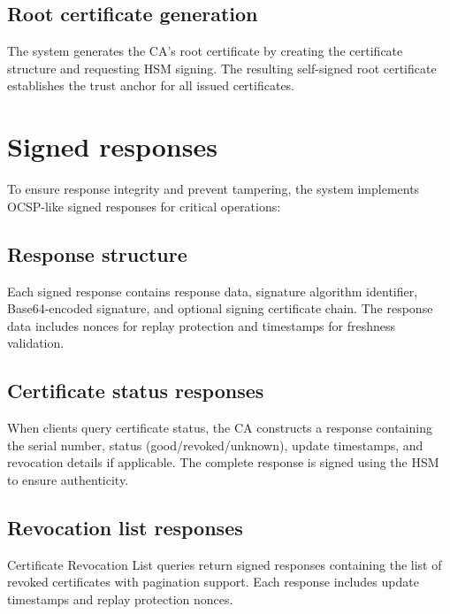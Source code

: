 \subsection{Root certificate generation}
The system generates the CA's root certificate 
by creating the certificate structure and requesting HSM signing. The resulting 
self-signed root certificate establishes the trust anchor for all issued certificates.

\section{Signed responses}

To ensure response integrity and prevent tampering, the system implements 
OCSP-like signed responses for critical operations:

\subsection{Response structure}
Each signed response contains response data, 
signature algorithm identifier, Base64-encoded signature, and optional signing 
certificate chain. The response data includes nonces for replay protection 
and timestamps for freshness validation.

\subsection{Certificate status responses}
When clients query certificate status, 
the CA constructs a response containing the serial number, status (good/revoked/unknown), 
update timestamps, and revocation details if applicable. The complete response 
is signed using the HSM to ensure authenticity.

\subsection{Revocation list responses}
Certificate Revocation List queries return 
signed responses containing the list of revoked certificates with pagination 
support. Each response includes update timestamps and replay protection nonces.



